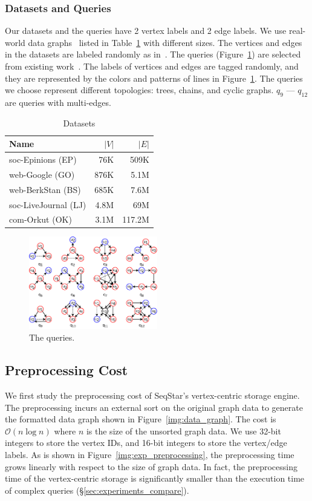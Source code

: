 \subsubsection{Datasets and Queries}
Our datasets and the queries have 2 vertex labels and 2 edge labels.
We use real-world data graphs~\cite{snapnets} listed in Table~\ref{tab:datasets} with different sizes. The vertices and edges in the datasets are labeled randomly as in~\cite{DBLP:journals/pvldb/MhedhbiS19}.
The queries (Figure~\ref{img:queries}) are selected from existing work~\cite{DBLP:conf/cloud/SerafiniMS17,DBLP:journals/pvldb/MhedhbiS19}.
The labels of vertices and edges are tagged randomly,
and they are represented by the colors and patterns of lines in Figure~\ref{img:queries}.
The queries we choose represent different topologies: trees, chains, and cyclic graphs.
$q_9$ --- $q_{12}$ are queries with multi-edges.
\begin{table}
  \caption{Datasets}\label{tab:datasets}
  \begin{tabular}{lrr}
    \toprule
    Name & $|V|$ & $|E|$ \\
    \midrule
    soc-Epinions (EP) & 76K & 509K \\
    web-Google (GO) & 876K & 5.1M \\
    web-BerkStan (BS) & 685K & 7.6M \\
    soc-LiveJournal (LJ) & 4.8M & 69M \\
    com-Orkut (OK) & 3.1M & 117.2M \\
    \bottomrule
  \end{tabular}
\end{table}

\begin{figure}[ht]
  \centering
  \includegraphics[width=0.5\textwidth]{img/queries.pdf}
  \caption{The queries.}\label{img:queries}
\end{figure}

\subsection{Preprocessing Cost}
We first study the preprocessing cost of SeqStar's vertex-centric storage engine.
The preprocessing incurs an external sort on the original graph data to generate the formatted data graph shown in Figure~\ref{img:data_graph}.
The cost is $\mathcal{O}(n \log n)$ where $n$ is the size of the unsorted graph data.
We use 32-bit integers to store the vertex IDs, and 16-bit integers to store the vertex/edge labels.
As is shown in Figure~\ref{img:exp_preprocessing}, the preprocessing time grows linearly with respect to the size of graph data.
In fact, the preprocessing time of the vertex-centric storage is significantly smaller than the execution time of complex queries (\S\ref{sec:experiments_compare}).

